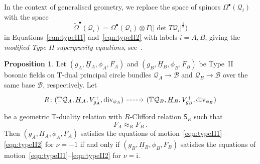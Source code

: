 \documentclass[a4paper, reqno, 11pt]{amsart}
\numberwithin{equation}{section}
\theoremstyle{definition}
\newtheorem{proposition}[equation]{Proposition}
\newcommand{\red}[1]{\underline{#1}}
\newcommand{\ii}{\mathrm{i}}
\newcommand{\IT}{\mathbb{T}}
\newcommand{\cB}{{\mathcal B}}
\newcommand{\cQ}{{\mathcal Q}}
\newcommand{\sfS}{{\mathsf{S}}}
\newcommand{\sfGamma}{{\mathsf{\Gamma}}}
\newcommand{\sfOmega}{{\mathsf{\Omega}}}
\renewcommand{\div}{{\rm div}}
\theoremstyle{remark}
\begin{document}
In the context of generalised geometry, we replace the space of spinors $\sfOmega^\bullet(\cQ_i)$ with the space $$\widetilde{\sfOmega}^\bullet(\cQ_i) = \sfOmega^\bullet(\cQ_i) \otimes \sfGamma\big(|\det T\cQ_i|^{\frac12}\big)$$ in Equations~\eqref{eqn:typeII1} and~\eqref{eqn:typeII2} with labels $i=A,B$, giving the \emph{modified Type II supergravity equations}, see~\cite[Section 7.1]{Severa:2018pag}.

\begin{proposition}\label{prop:TdualitytypeII}
    Let $(g_A,\red H{}_A,\phi_A, F_A)$ and $(g_B, \red H{}_B, \phi_B, F_B)$ be Type~II bosonic fields on T-dual principal circle bundles $\cQ_A\to\cB$ and $\cQ_B \to \cB$ over the same base $\cB$, respectively.  Let
    \begin{equation}
\begin{tikzcd}
 R  \colon (\IT\cQ_A, \red H{}_A, V^+_{g_A}, \div_{\phi_A}) \ar[r,dashed] &  (\IT \cQ_B, \red H{}_B, V^+_{g_B}, \div_{\phi_B})
 \end{tikzcd}
\end{equation} 
    be a geometric T-duality relation with $R$-Clifford relation $\sfS_R$ such that $$F_A \approx_R F_B \ . $$
    Then $(g_A,\red H{}_A,\phi_A, F_A)$ satisfies the equations of motion~\eqref{eqn:typeII1}--\eqref{eqn:typeII2} for $\nu = -1$ if and only if $(g_B,\red H{}_B,\phi_B, F_B)$ satisfies the equations of motion~\eqref{eqn:typeII1}--\eqref{eqn:typeII2} for $\nu = \ii$.
\end{proposition}
\end{document}
